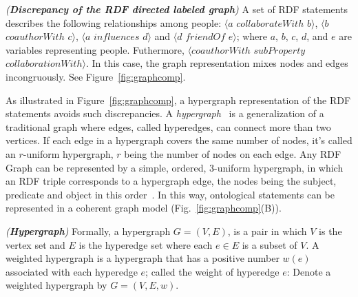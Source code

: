 \begin{myexp}
\label{graphcomp}
\emph{(\textbf{Discrepancy of the RDF directed labeled graph})}
A set of RDF statements describes the following relationships among people: $\langle a$ $collaborateWith$ $b\rangle$, $\langle b$ $coauthorWith$ $c\rangle$, $\langle a$ $influences$ $d\rangle$ and $\langle d$ $friendOf$ $e\rangle$; where $a$, $b$, $c$, $d$, and $e$ are variables representing people. Futhermore, $\langle coauthorWith $ $subProperty$ $collaborationWith\rangle$. In this case, the graph representation mixes nodes and edges incongruously. See Figure~\ref{fig:graphcomp}.
\end{myexp}

As illustrated in Figure~\ref{fig:graphcomp}, a hypergraph representation of the RDF statements avoids such discrepancies.  A \emph{hypergraph}~\cite{Hypergraph} is a generalization of a traditional graph where edges, called hyperedges, can connect more than two vertices. If each edge in a hypergraph covers the same number of nodes, it's called an $r$-uniform hypergraph, $r$ being the number of nodes on each edge. Any RDF Graph can be represented by a simple, ordered, 3-uniform hypergraph, in which an RDF triple corresponds to a hypergraph edge, the nodes being the subject, predicate and object in this order~\cite{GraphModelRDF}. In this way, ontological statements can be represented in a coherent graph model (Fig.~\ref{fig:graphcomp}(B)).

\begin{mydef}
\emph{(\textbf{Hypergraph})}
Formally, a hypergraph $G = (V,E)$, is a pair in which $V$ is the vertex set and $E$ is the hyperedge set where each $e \in E$ is a subset of $V$. A weighted hypergraph is a hypergraph that has a positive number $w(e)$ associated with each hyperedge $e$; called the weight of hyperedge $e$: Denote a weighted hypergraph by $G = (V,E,w)$.
\end{mydef}

